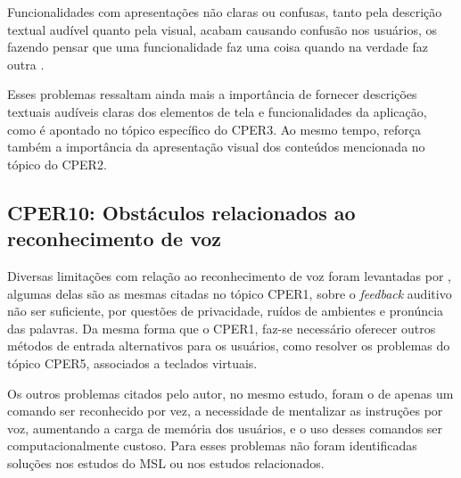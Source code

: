 Funcionalidades com apresentações não claras ou confusas, tanto pela descrição textual audível quanto pela visual, acabam
causando confusão nos usuários, os fazendo pensar que uma funcionalidade faz uma coisa quando na verdade faz outra \cite{Christoph2020}.

Esses problemas ressaltam ainda mais a importância de fornecer descrições textuais audíveis claras dos elementos de tela
e funcionalidades da aplicação, como é apontado no tópico específico do CPER3. Ao mesmo tempo, reforça também a importância
da apresentação visual dos conteúdos mencionada no tópico do CPER2.

\subsection{CPER10: Obstáculos relacionados ao reconhecimento de voz}

Diversas limitações com relação ao reconhecimento de voz foram levantadas por , algumas delas
são as mesmas citadas no tópico CPER1, sobre o \emph{feedback} auditivo não ser suficiente, por questões de privacidade,
ruídos de ambientes e pronúncia das palavras. Da mesma forma que o CPER1, faz-se necessário oferecer outros métodos
de entrada alternativos para os usuários, como resolver os problemas do tópico CPER5, associados a teclados virtuais.

Os outros problemas citados pelo autor, no mesmo estudo, foram o de apenas um comando ser reconhecido por vez, a necessidade
de mentalizar as instruções por voz, aumentando a carga de memória dos usuários, e o uso desses comandos ser computacionalmente
custoso. Para esses problemas não foram identificadas soluções nos estudos do MSL ou nos estudos relacionados.
